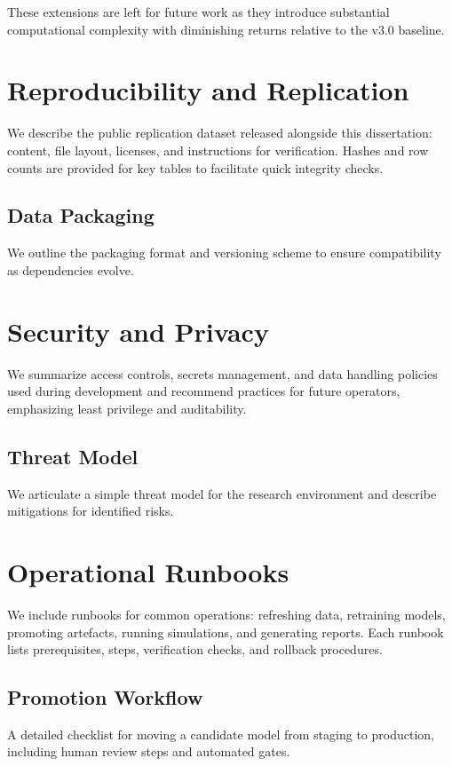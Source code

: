 \documentclass[12pt]{report}  %
\numberwithin{equation}{section}
\theoremstyle{plain}
\theoremstyle{definition}
\theoremstyle{remark}
\begin{document}
These extensions are left for future work as they introduce substantial computational complexity with diminishing returns relative to the v3.0 baseline.


\chapter{Reproducibility and Replication}
We describe the public replication dataset released alongside this dissertation: content, file layout, licenses, and instructions for verification. Hashes and row counts are provided for key tables to facilitate quick integrity checks.

\section{Data Packaging}
We outline the packaging format and versioning scheme to ensure compatibility as dependencies evolve.

\chapter{Security and Privacy}
We summarize access controls, secrets management, and data handling policies used during development and recommend practices for future operators, emphasizing least privilege and auditability.

\section{Threat Model}
We articulate a simple threat model for the research environment and describe mitigations for identified risks.

\chapter{Operational Runbooks}
We include runbooks for common operations: refreshing data, retraining models, promoting artefacts, running simulations, and generating reports. Each runbook lists prerequisites, steps, verification checks, and rollback procedures.

\section{Promotion Workflow}
A detailed checklist for moving a candidate model from staging to production, including human review steps and automated gates.
\end{document}
